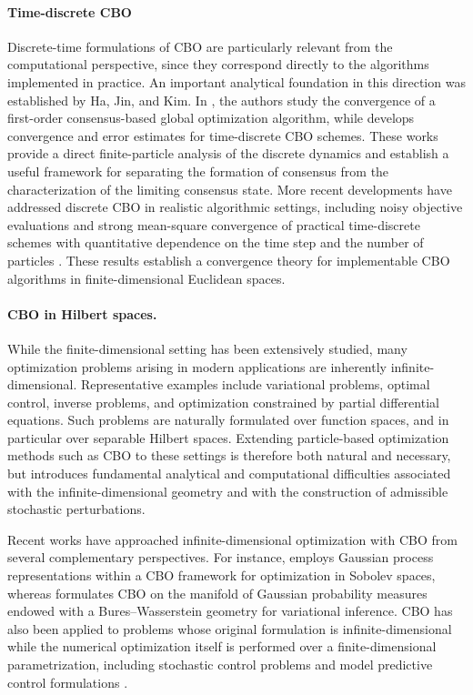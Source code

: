 \documentclass[12pt]{amsart}
\numberwithin{equation}{section}
\begin{document}
\paragraph{\textbf{Time-discrete CBO}}
Discrete-time formulations of CBO are particularly relevant from the computational perspective, since they correspond directly to the algorithms implemented in practice. An important analytical foundation in this direction was established by Ha, Jin, and Kim. In \cite{ha2020convergence}, the authors study the convergence of a first-order consensus-based global optimization algorithm, while \cite{ha2021convergence} develops convergence and error estimates for time-discrete CBO schemes. These works provide a direct finite-particle analysis of the discrete dynamics and establish a useful framework for separating the formation of consensus from the characterization of the limiting consensus state. More recent developments have addressed discrete CBO in realistic algorithmic settings, including noisy objective evaluations \cite{bellavia2025discrete} and strong mean-square convergence of practical time-discrete schemes with quantitative dependence on the time step and the number of particles \cite{bonandin2025strong}. These results establish a convergence theory for implementable CBO algorithms in finite-dimensional Euclidean spaces.

\paragraph{\textbf{CBO in Hilbert spaces.}}
While the finite-dimensional setting has been extensively studied, many optimization problems arising in modern applications are inherently infinite-dimensional. Representative examples include variational problems, optimal control, inverse problems, and optimization constrained by partial differential equations. Such problems are naturally formulated over function spaces, and in particular over separable Hilbert spaces. Extending particle-based optimization methods such as CBO to these settings is therefore both natural and necessary, but introduces fundamental analytical and computational difficulties associated with the infinite-dimensional geometry and with the construction of admissible stochastic perturbations.

Recent works have approached infinite-dimensional optimization with CBO from several complementary perspectives. For instance, \cite{khatab2026consensus} employs Gaussian process representations within a CBO framework for optimization in Sobolev spaces, whereas \cite{borghi2026variational} formulates CBO on the manifold of Gaussian probability measures endowed with a Bures--Wasserstein geometry for variational inference. CBO has also been applied to problems whose original formulation is infinite-dimensional while the numerical optimization itself is performed over a finite-dimensional parametrization, including stochastic control problems \cite{lyu2025consensus} and model predictive control formulations \cite{borghi2025model}.
\end{document}
